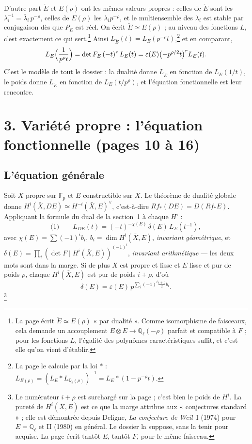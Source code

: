 \documentclass[11pt,a4paper]{article}
\begin{document}
D'autre part $\check E$ et $E(\rho)$ ont les mêmes valeurs propres : celles de
$\check E$ sont les $\lambda_i^{-1} = \bar\lambda_i\,p^{-\rho}$, celles de
$E(\rho)$ les $\lambda_i p^{-\rho}$, et le multiensemble des $\lambda_i$ est
stable par conjugaison dès que $P_E$ est réel. On écrit
$\check E \simeq E(\rho)$ ; au niveau des fonctions $L$, c'est
exactement ce qui sert.\footnote{La page écrit $\check E \simeq E(\rho)$ « par
dualité ». Comme isomorphisme de faisceaux, cela demande un accouplement
$E \otimes E \to \mathbb{Q}_\ell(-\rho)$ parfait et compatible à $F$ ; pour les
fonctions $L$, l'égalité des polynômes caractéristiques suffit, et c'est elle
qu'on vient d'établir.} Ainsi
$L_{\check E}(t) = L_E(p^{-\rho}t)$,\footnote{La page le calcule par la loi $*$ :
$L_{E(\rho)} = (L_E * L_{\mathbb{Q}_\ell(\rho)})^{-1} = L_E * (1 - p^{-\rho}t)$.}
et en comparant,
\[
  L_E\Bigl(\frac{1}{p^{\rho}t}\Bigr) = \det F_E\,(-t)^{r}\,L_E(t)
  = \varepsilon(E)\bigl(-p^{\rho/2}t\bigr)^{r} L_E(t) .
\]
C'est le modèle de tout le dossier : la dualité donne $L_{\check E}$ en fonction
de $L_E(1/t)$, le poids donne $L_{\check E}$ en fonction de $L_E(t/p^\rho)$, et
l'équation fonctionnelle est leur rencontre.

\section*{3. Variété propre : l'équation fonctionnelle (pages 10 à 16)}

\subsection*{L'équation générale}

Soit $X$ propre sur $\mathbb{F}_p$ et $E$ constructible sur $X$. Le théorème de
dualité globale donne $H^i(\bar X, DE) \simeq H^{-i}(\bar X, E)^{\vee}$,
c'est-à-dire $Rf_{*}(DE) = D(Rf_{*}E)$. Appliquant la formule du dual de la
section~1 à chaque $H^i$ :
\[
  \text{(1)}\qquad
  L_{DE}(t) = (-t)^{-\chi(E)}\,\delta(E)\,L_E(t^{-1}),
\]
avec $\chi(E) = \sum (-1)^i b_i$, $b_i = \dim H^i(\bar X, E)$, \emph{invariant
géométrique}, et $\delta(E) = \prod_i (\det F \mid H^i(\bar X, E))^{(-1)^i}$,
\emph{invariant arithmétique} --- les deux mots sont dans la marge. Si de plus
$X$ est propre et lisse et $E$ lisse et pur de poids $\rho$, chaque
$H^i(\bar X, E)$ est pur de poids $i + \rho$, d'où
\[
  \delta(E) = \varepsilon(E)\, p^{\sum_i (-1)^i \frac{i+\rho}{2} b_i} .
\]
\footnote{Le numérateur $i + \rho$ est surchargé sur la page ; c'est bien le
poids de $H^i$. La pureté de $H^i(\bar X, E)$ est ce que la marge attribue
aux « conjectures standard » ; elle est démontrée depuis Deligne, \emph{La
conjecture de Weil}~I (1974) pour $E = \mathbb{Q}_\ell$ et II (1980) en
général. Le dossier la suppose, sans la tenir pour acquise. La page écrit tantôt
$E$, tantôt $F$, pour le même faisceau.}
\end{document}
